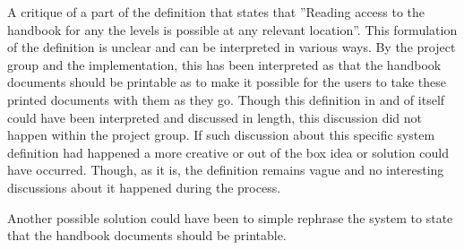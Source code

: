 A critique of a part of the definition that states that ''Reading access to the handbook for any the levels is possible at any relevant location''.
This formulation of the definition is unclear and can be interpreted in various ways.
By the project group and the implementation, this has been interpreted as that the handbook documents should be printable as to make it possible for the users to take these printed documents with them as they go.
Though this definition in and of itself could have been interpreted and discussed in length, this discussion did not happen within the project group.
If such discussion about this specific system definition had happened a more creative or out of the box idea or solution could have occurred.
Though, as it is, the definition remains vague and no interesting discussions about it happened during the process.

Another possible solution could have been to simple rephrase the system to state that the handbook documents should be printable.
